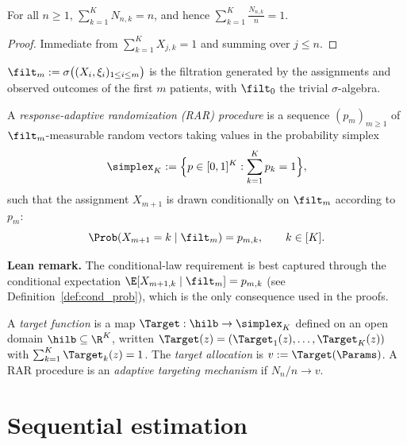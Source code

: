 \begin{lemma}\label{lem:counts_sum}
\leanok
{}
For all $n \ge 1$, $\sum_{k=1}^K N_{n,k} = n$, and hence
$\sum_{k=1}^K \frac{N_{n,k}}{n} = 1$.
\end{lemma}

\begin{proof}\leanok
{}
Immediate from $\sum_{k=1}^K X_{j,k} = 1$ and summing over $j \le n$.
\end{proof}

\begin{definition}[Filtration]\label{def:filtration}
\leanok
{}
$\filt_m := \sigma\big((X_i, \xi_i)_{1 \le i \le m}\big)$ is the filtration
generated by the assignments and observed outcomes of the first $m$ patients,
with $\filt_0$ the trivial $\sigma$-algebra.
\end{definition}

\begin{definition}\label{def:rar}
A \emph{response-adaptive randomization (RAR) procedure} is a sequence
$(p_m)_{m \ge 1}$ of $\filt_m$-measurable random vectors taking values in the
probability simplex
\[
  \simplex_K := \Big\{ p \in [0,1]^K : \sum_{k=1}^K p_k = 1 \Big\},
\]
such that the assignment $X_{m+1}$ is drawn conditionally on $\filt_m$ according
to $p_m$:
\[
  \Prob(X_{m+1} = k \mid \filt_m) = p_{m,k}, \qquad k \in [K].
\]
\end{definition}

\textbf{Lean remark.} The conditional-law requirement is best captured through
the conditional expectation $\E[X_{m+1,k} \mid \filt_m] = p_{m,k}$
(see Definition~\ref{def:cond_prob}), which is the only consequence used in the proofs.

\begin{definition}\label{def:target}
A \emph{target function} is a map $\Target : \hilb \to \simplex_K$ defined on an
open domain $\hilb \subseteq \R^K$, written
$\Target(z) = (\Target_1(z), \dots, \Target_K(z))$ with
$\sum_{k=1}^K \Target_k(z) = 1$. The \emph{target allocation} is
$v := \Target(\Params)$. A RAR procedure is an \emph{adaptive targeting
mechanism} if $N_n/n \to v$.
\end{definition}

\section{Sequential estimation}
\label{sec:model_estimation}

